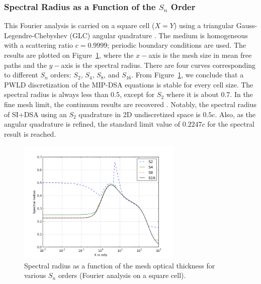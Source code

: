 \documentclass[preprint,10pt]{elsarticle}
\renewcommand{\(}{\left(}
\renewcommand{\)}{\right)}
\renewcommand{\[}{\left[}
\renewcommand{\]}{\right]}
\newcommand{\sn}{\ensuremath{S_n}\xspace}
\begin{document}
\subsubsection{Spectral Radius as a Function of the $S_n$ Order}

This Fourier analysis is carried on a square cell ($X=Y$) using a triangular 
Gauss-Legendre-Chebyshev (GLC) angular quadrature \cite{quadrature}. The medium is homogeneous with a 
scattering ratio $c=0.9999$; periodic boundary conditions are used. The results 
are plotted on Figure~\ref {fig_fa_sn}, where the $x-$axis is the mesh size in mean free 
paths and the $y-$axis is the spectral radius. There are four curves corresponding 
to different $S_n$ orders: $S_2$, $S_4$, $S_8$, and $S_{16}$.
From Figure~\ref {fig_fa_sn}, we conclude that a PWLD discretization of the MIP-DSA equations 
is stable for every cell size. The spectral radius is always less than 0.5, except for $S_2$ where 
it is about 0.7. In the fine mesh limit, the continuum results are recovered \cite{multisweep}. Notably,
the spectral radius of SI+DSA using an $S_2$ quadrature in 2D undiscretized space is $0.5c$. Also, as the angular 
quadrature is refined, the standard limit value of $0.2247c$ for the spectral result is reached.
\begin{figure}[!htbp]
  \centering
  \includegraphics[width=0.7\textwidth]{sn_order_9999}
  \caption{Spectral radius as a function of the mesh optical thickness for various \sn orders (Fourier analysis on a square cell).}
  \label{fig_fa_sn}
\end{figure}
\end{document}

